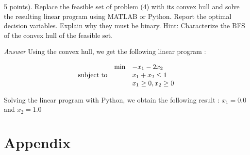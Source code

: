 \documentclass[10pt]{article}
\newenvironment{exercise}[2][Exercise]{\begin{trivlist}
  \item[\hskip \labelsep {\bfseries #1}\hskip \labelsep {\bfseries #2.}]}{\end{trivlist}}
\begin{document}
\begin{exercise}{4}
(5 points). Replace the feasible set of problem (4) with its convex hull and solve the resulting linear program using MATLAB or Python. Report the optimal decision variables. Explain why they must be binary. Hint:
Characterize the BFS of the convex hull of the feasible set.


\textit{Answer}
Using the convex hull, we get the following linear program : 


\begin{equation*}
\begin{array}{lll@{}lll}
&\text{min}  & - x_1 - 2 x_2  &\\
\text{subject to} 
&& x_1 + x_2 \leq 1 \\
&&  x_1  \geq 0,  x_2 \geq 0 \\
          
\end{array}
\end{equation*}

Solving the linear program with Python, we obtain  the following result : $x_1 =  0.0$ and $x_2 = 1.0$


\end{exercise}
  

  \section*{Appendix}
\newpage  
 \begin{thebibliography}{9}

\end{thebibliography}
 
\end{document}
